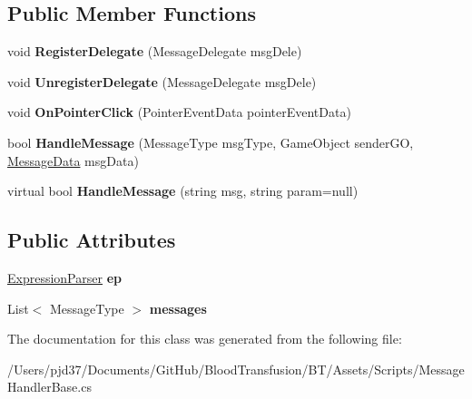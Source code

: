 \subsection*{Public Member Functions}
\begin{DoxyCompactItemize}
\item 
void {\bfseries Register\+Delegate} (Message\+Delegate msg\+Dele)\hypertarget{class_message_handler_base_a5929d0b10bcfa5aecb908e08b7914b6b}{}\label{class_message_handler_base_a5929d0b10bcfa5aecb908e08b7914b6b}

\item 
void {\bfseries Unregister\+Delegate} (Message\+Delegate msg\+Dele)\hypertarget{class_message_handler_base_af2066351a0a0d1a9e12947def61fd8d1}{}\label{class_message_handler_base_af2066351a0a0d1a9e12947def61fd8d1}

\item 
void {\bfseries On\+Pointer\+Click} (Pointer\+Event\+Data pointer\+Event\+Data)\hypertarget{class_message_handler_base_a8da12a386798364d6834bee815c75b14}{}\label{class_message_handler_base_a8da12a386798364d6834bee815c75b14}

\item 
bool {\bfseries Handle\+Message} (Message\+Type msg\+Type, Game\+Object sender\+GO, \hyperlink{class_message_data}{Message\+Data} msg\+Data)\hypertarget{class_message_handler_base_a68ece9b48cb307fad716840b1518aa6b}{}\label{class_message_handler_base_a68ece9b48cb307fad716840b1518aa6b}

\item 
virtual bool {\bfseries Handle\+Message} (string msg, string param=null)\hypertarget{class_message_handler_base_ac675a0af7c374bed4e8a0bc88b0b0c96}{}\label{class_message_handler_base_ac675a0af7c374bed4e8a0bc88b0b0c96}

\end{DoxyCompactItemize}
\subsection*{Public Attributes}
\begin{DoxyCompactItemize}
\item 
\hyperlink{class_expression_parser}{Expression\+Parser} {\bfseries ep}\hypertarget{class_message_handler_base_afc2b8ade8dd1c13679d60a919308a563}{}\label{class_message_handler_base_afc2b8ade8dd1c13679d60a919308a563}

\item 
List$<$ Message\+Type $>$ {\bfseries messages}\hypertarget{class_message_handler_base_a02a1b3263bdb5a9a95d8c840031e9725}{}\label{class_message_handler_base_a02a1b3263bdb5a9a95d8c840031e9725}

\end{DoxyCompactItemize}


The documentation for this class was generated from the following file\+:\begin{DoxyCompactItemize}
\item 
/\+Users/pjd37/\+Documents/\+Git\+Hub/\+Blood\+Transfusion/\+B\+T/\+Assets/\+Scripts/Message\+Handler\+Base.\+cs\end{DoxyCompactItemize}
